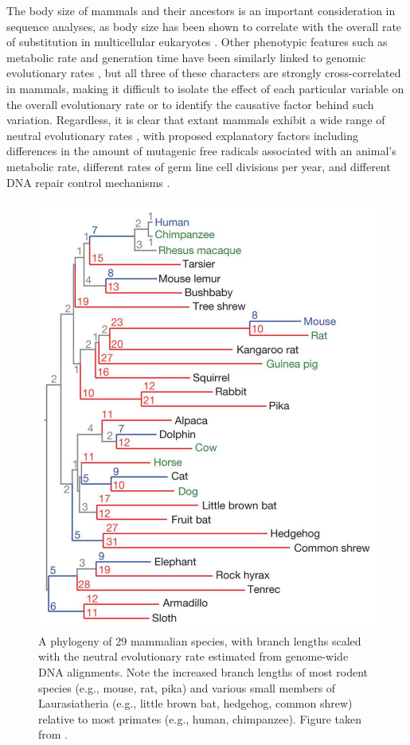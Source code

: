 The body size of mammals and their ancestors is an important
consideration in sequence analyses, as body size has been shown to
correlate with the overall rate of substitution in multicellular
eukaryotes
\citep{Mouse2002Initial,Hwang2004a,Welch2008,Galtier2009,Romiguier2010,
  Bromham2011}.  Other phenotypic features such as metabolic rate and
generation time have been similarly linked to genomic evolutionary
rates \citep{Martin1993,Nabholz2008}, but all three of these
characters are strongly cross-correlated in mammals, making it
difficult to isolate the effect of each particular variable on the
overall evolutionary rate or to identify the causative factor behind
such variation. Regardless, it is clear that extant mammals exhibit a
wide range of neutral evolutionary rates \citep{BinindaEmonds2007b},
with proposed explanatory factors including differences in the amount
of mutagenic free radicals associated with an animal's metabolic rate,
different rates of germ line cell divisions per year, and different
DNA repair control mechanisms \citep{Baer2007}.

\begin{figure}
\centering
\includegraphics[scale=0.3]{Figs/mammals_29.pdf}
\caption{A phylogeny of 29 mammalian species, with branch lengths
  scaled with the neutral evolutionary rate estimated from genome-wide
  DNA alignments. Note the increased branch lengths of most rodent
  species (e.g., mouse, rat, pika) and various small members of
  Laurasiatheria (e.g., little brown bat, hedgehog, common shrew)
  relative to most primates (e.g., human, chimpanzee). Figure taken
  from \citet{LindbladToh2011}.}
\label{fig_mammals_29}
\end{figure}

